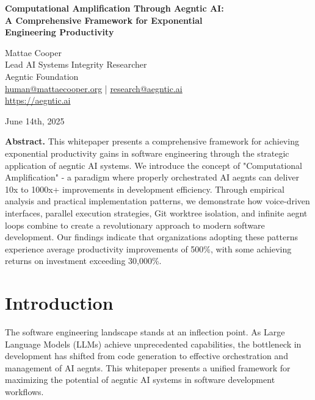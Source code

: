 \documentclass[11pt]{article}
\begin{document}
\begin{center}
{\LARGE \textbf{Computational Amplification Through Aegntic AI:\\A Comprehensive Framework for Exponential\\Engineering Productivity}}

\vspace{1em}

{\large Mattae Cooper}\\
{\small Lead AI Systems Integrity Researcher}\\
{\small Aegntic Foundation}\\
{\small \href{mailto:human@mattaecooper.org}{human@mattaecooper.org} | \href{mailto:research@aegntic.ai}{research@aegntic.ai}}\\
{\small \url{https://aegntic.ai}}

\vspace{1em}

{\small June 14th, 2025}
\end{center}

\vspace{2em}

\textbf{Abstract.} This whitepaper presents a comprehensive framework for achieving exponential productivity gains in software engineering through the strategic application of aegntic AI systems. We introduce the concept of "Computational Amplification" - a paradigm where properly orchestrated AI aegnts can deliver 10x to 1000x+ improvements in development efficiency. Through empirical analysis and practical implementation patterns, we demonstrate how voice-driven interfaces, parallel execution strategies, Git worktree isolation, and infinite aegnt loops combine to create a revolutionary approach to modern software development. Our findings indicate that organizations adopting these patterns experience average productivity improvements of 500\%, with some achieving returns on investment exceeding 30,000\%.

\section{Introduction}

The software engineering landscape stands at an inflection point. As Large Language Models (LLMs) achieve unprecedented capabilities, the bottleneck in development has shifted from code generation to effective orchestration and management of AI aegnts. This whitepaper presents a unified framework for maximizing the potential of aegntic AI systems in software development workflows.
\end{document}

